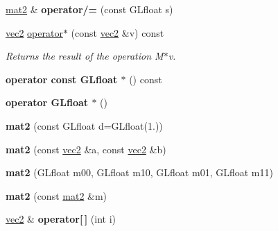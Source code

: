 \begin{DoxyCompactItemize}
\item 
\hypertarget{class_angel_1_1mat2_a3f640fcf2112a0235cd981db74efefb4}{\hyperlink{class_angel_1_1mat2}{mat2} \& {\bfseries operator/=} (const \-G\-Lfloat s)}\label{class_angel_1_1mat2_a3f640fcf2112a0235cd981db74efefb4}

\item 
\hyperlink{struct_angel_1_1vec2}{vec2} \hyperlink{class_angel_1_1mat2_a820b6ba808e7b9e7a3c9b920c8607699}{operator$\ast$} (const \hyperlink{struct_angel_1_1vec2}{vec2} \&v) const 
\begin{DoxyCompactList}\small\item\em \-Returns the result of the operation \-M$\ast$v. \end{DoxyCompactList}\item 
\hypertarget{class_angel_1_1mat2_ae267322fed2392dcf771830cc4ce2432}{{\bfseries operator const G\-Lfloat $\ast$} () const }\label{class_angel_1_1mat2_ae267322fed2392dcf771830cc4ce2432}

\item 
\hypertarget{class_angel_1_1mat2_aa39e088417f349c51331dfc75bfa78d5}{{\bfseries operator G\-Lfloat $\ast$} ()}\label{class_angel_1_1mat2_aa39e088417f349c51331dfc75bfa78d5}

\item 
\hypertarget{class_angel_1_1mat2_ae102b820abff2323c45227b2b8bbf750}{{\bfseries mat2} (const \-G\-Lfloat d=\-G\-Lfloat(1.))}\label{class_angel_1_1mat2_ae102b820abff2323c45227b2b8bbf750}

\item 
\hypertarget{class_angel_1_1mat2_a28913fa178e1d31303701bfb68a18206}{{\bfseries mat2} (const \hyperlink{struct_angel_1_1vec2}{vec2} \&a, const \hyperlink{struct_angel_1_1vec2}{vec2} \&b)}\label{class_angel_1_1mat2_a28913fa178e1d31303701bfb68a18206}

\item 
\hypertarget{class_angel_1_1mat2_a922505784f3ff68666c32ea610d98579}{{\bfseries mat2} (\-G\-Lfloat m00, \-G\-Lfloat m10, \-G\-Lfloat m01, \-G\-Lfloat m11)}\label{class_angel_1_1mat2_a922505784f3ff68666c32ea610d98579}

\item 
\hypertarget{class_angel_1_1mat2_a4311450f6bb2b9c0413470c1877718f7}{{\bfseries mat2} (const \hyperlink{class_angel_1_1mat2}{mat2} \&m)}\label{class_angel_1_1mat2_a4311450f6bb2b9c0413470c1877718f7}

\item 
\hypertarget{class_angel_1_1mat2_adf772dd732664fed8bd2eea9509d5c98}{\hyperlink{struct_angel_1_1vec2}{vec2} \& {\bfseries operator\mbox{[}$\,$\mbox{]}} (int i)}\label{class_angel_1_1mat2_adf772dd732664fed8bd2eea9509d5c98}


\end{DoxyCompactItemize}
